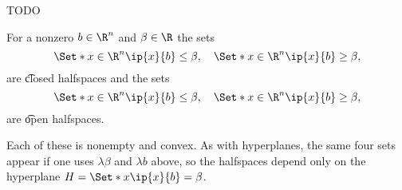 

TODO


For a nonzero $b \in \R^n$ and $\beta \in \R$ the sets
$$
  \Set*{x \in \R^n}{\ip{x}{b} \leq \beta}, \quad \Set*{x \in \R^n}{\ip{x}{b} \geq \beta},
$$
are \t{closed halfspaces} and the sets
$$
  \Set*{x \in \R^n}{\ip{x}{b} \leq \beta}, \quad \Set*{x \in \R^n}{\ip{x}{b} \geq \beta},
$$
are \t{open halfspaces}.

Each of these is nonempty and convex.
As with hyperplanes, the same four sets appear if one uses $\lambda \beta$ and $\lambda b$ above, so the halfspaces depend only on the hyperplane $H = \Set*{x}{\ip{x}{b} = \beta}$.
